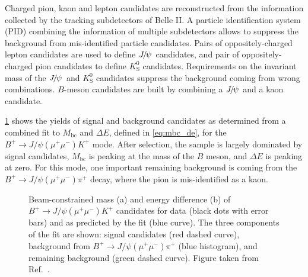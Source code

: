 \documentclass{moriond}
\def\Mbc{\ensuremath{M_{\mathrm{bc}}}\xspace}
\def\dE{\ensuremath{\Delta E}\xspace}
\def\jpsi{\ensuremath{{J\mskip -3mu/\mskip -2mu\psi\mskip 2mu}}\xspace}
\def\mumu{\ensuremath{\mu^+\mu^-}\xspace}
\def\Bp{\ensuremath{B^+}\xspace}
\def\Kp{\ensuremath{K^+}\xspace}
\def\KS{\ensuremath{K^0_{\mathrm{S}}}\xspace}
\begin{document}
Charged pion, kaon and lepton candidates are reconstructed from the information collected by the tracking subdetectors of Belle II.
A particle identification system (PID) combining the information of multiple subdetectors allows to suppress the background from mis-identified particle candidates.
Pairs of oppositely-charged lepton candidates are used to define \jpsi candidates, and pair of oppositely-charged pion candidates to define \KS candidates.
Requirements on the invariant mass of the \jpsi and \KS candidates suppress the background coming from wrong combinations. 
$B$-meson candidates are built by combining a \jpsi and a kaon candidate.

\cref{fig:jpsik} shows the yields of signal and background candidates as determined from a combined fit to \Mbc and \dE, defined in \cref{eq:mbc_de}, for the $\Bp \to J/\psi(\mumu) \Kp$ mode.
After selection, the sample is largely dominated by signal candidates, \Mbc is peaking at the mass of the $B$ meson, and \dE is peaking at zero.
For this mode, one important remaining background is coming from the $\Bp \to J/\psi(\mumu) \pi^ +$ decay, where the pion is mis-identified as a kaon.

\begin{figure}[tb]
\centering
{}
\caption{Beam-constrained mass (a) and energy difference (b) of $\Bp \to J/\psi(\mumu) \Kp$ candidates for data (black dots with error bars) and as predicted by the fit (blue curve).
The three components of the fit are shown: signal candidates (red dashed curve), background from $\Bp \to J/\psi(\mumu) \pi^ +$ (blue histogram), and remaining background (green dashed curve).
Figure taken from Ref.~{\protect\cite{Belle-II:2022dbo}}.}
\label{fig:jpsik}
\end{figure}
\end{document}
